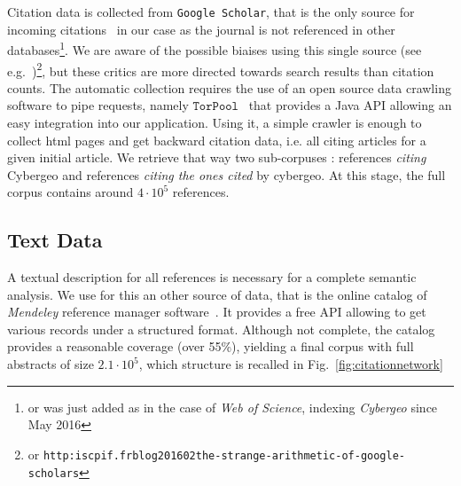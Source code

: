 Citation data is collected from \texttt{Google Scholar}, that is the only source for incoming citations~\cite{noruzi2005google} in our case as the journal is not referenced in other databases\footnote{or was just added as in the case of \textit{Web of Science}, indexing \textit{Cybergeo} since May 2016}. We are aware of the possible biaises using this single source (see e.g.~\cite{bohannon2014scientific})\footnote{or \texttt{http:\/\/iscpif.fr\/blog\/2016\/02\/the-strange-arithmetic-of-google-scholars}}, but these critics are more directed towards search results than citation counts. The automatic collection requires the use of an open source data crawling software to pipe requests, namely $\texttt{TorPool}$~\cite{} %
 that provides a Java API allowing an easy integration into our application. Using it, a simple crawler is enough to collect html pages and get backward citation data, i.e. all citing articles for a given initial article. We retrieve that way two sub-corpuses : references \emph{citing} Cybergeo and references \emph{citing the ones cited} by cybergeo. At this stage, the full corpus contains around $4\cdot10^5$ references.


\subsection*{Text Data}


A textual description for all references is necessary for a complete semantic analysis. We use for this an other source of data, that is the online catalog of \textit{Mendeley} reference manager software~\cite{}. It provides a free API allowing to get various records under a structured format. Although not complete, the catalog provides a reasonable coverage (over 55\%), yielding a final corpus with full abstracts of size $2.1\cdot 10^5$, which structure is recalled in Fig.~\ref{fig:citationnetwork}



